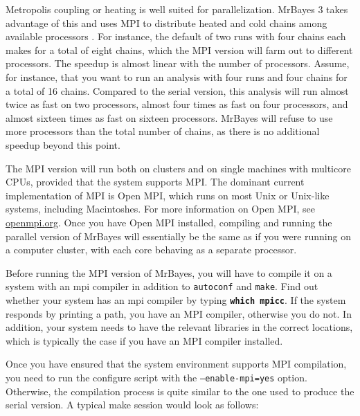 \documentclass[12pt]{book}
\newcommand{\ttt}[1]{\texttt{#1}}
\newcommand{\tb}[1]{\ttt{\textbf{#1}}}
\begin{document}
Metropolis coupling or heating is well suited for parallelization. MrBayes 3 takes advantage of
this and uses MPI to distribute heated and cold chains among available processors
\citep{altekar04}. For instance, the default of two runs with four chains each makes for a total of
eight chains, which the MPI version will farm out to different processors. The speedup is almost
linear with the number of processors. Assume, for instance, that you want to run an analysis with
four runs and four chains for a total of 16 chains. Compared to the serial version, this analysis
will run almost twice as fast on two processors, almost four times as fast on four processors, and
almost sixteen times as fast on sixteen processors. MrBayes will refuse to use more processors
than the total number of chains, as there is no additional speedup beyond this point.

The MPI version will run both on clusters and on single machines with multicore CPUs, provided that
the system supports MPI. The dominant current implementation of MPI is Open MPI, which runs on most
Unix or Unix-like systems, including Macintoshes. For more information on Open MPI, see
\url{openmpi.org}. Once you have Open MPI installed, compiling and running the parallel version of
MrBayes will essentially be the same as if you were running on a computer cluster, with each core
behaving as a separate processor.

Before running the MPI version of MrBayes, you will have to compile it on a system with an mpi
compiler in addition to \ttt{autoconf} and \ttt{make}. Find out whether your system has an mpi
compiler by typing \tb{which mpicc}. If the system responds by printing a path, you have an MPI
compiler, otherwise you do not. In addition, your system needs to have the relevant libraries in
the correct locations, which is typically the case if you have an MPI compiler installed.

Once you have ensured that the system environment supports MPI compilation, you need to run the
configure script with the \ttt{--enable-mpi=yes} option. Otherwise, the compilation process is
quite similar to the one used to produce the serial version. A typical make session would look as
follows:
\end{document}
